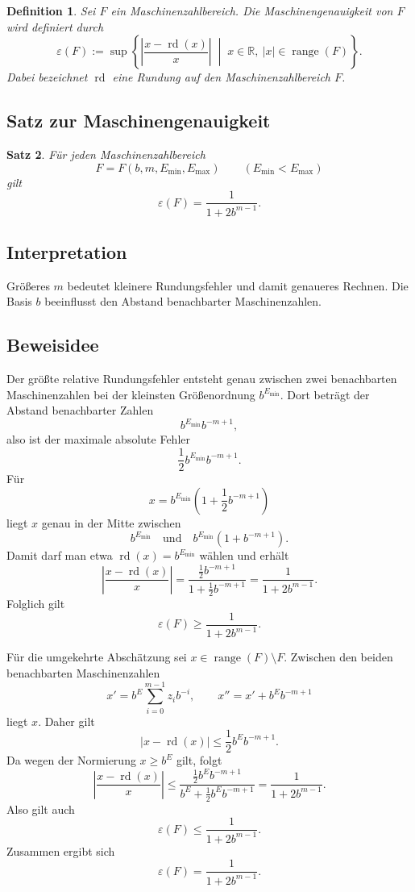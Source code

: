 \documentclass{article}
\newcommand{\R}{\mathbb{R}}
\newtheorem{thm}{Satz}
\newtheorem{defn}[thm]{Definition}
\begin{document}
\begin{defn}
Sei \(F\) ein Maschinenzahlbereich. Die Maschinengenauigkeit von \(F\) wird definiert durch
\[
\varepsilon(F)
:=
\sup\left\{
\left|\frac{x-\operatorname{rd}(x)}{x}\right|
\;\middle|\;
x\in\R,\ |x|\in\operatorname{range}(F)
\right\}.
\]
Dabei bezeichnet \(\operatorname{rd}\) eine Rundung auf den Maschinenzahlbereich \(F\).
\end{defn}

\subsection*{Satz zur Maschinengenauigkeit}

\begin{thm}
Für jeden Maschinenzahlbereich
\[
F=F(b,m,E_{\min},E_{\max})
\qquad (E_{\min}<E_{\max})
\]
gilt
\[
\varepsilon(F)=\frac{1}{1+2b^{m-1}}.
\]
\end{thm}

\subsection*{Interpretation}

Größeres \(m\) bedeutet kleinere Rundungsfehler und damit genaueres Rechnen. Die Basis \(b\) beeinflusst den Abstand benachbarter Maschinenzahlen.

\subsection*{Beweisidee}

Der größte relative Rundungsfehler entsteht genau zwischen zwei benachbarten Maschinenzahlen bei der kleinsten Größenordnung \(b^{E_{\min}}\). Dort beträgt der Abstand benachbarter Zahlen
\[
b^{E_{\min}}b^{-m+1},
\]
also ist der maximale absolute Fehler
\[
\frac12 b^{E_{\min}}b^{-m+1}.
\]
Für
\[
x=b^{E_{\min}}\left(1+\frac12 b^{-m+1}\right)
\]
liegt \(x\) genau in der Mitte zwischen
\[
b^{E_{\min}}
\quad\text{und}\quad
b^{E_{\min}}\left(1+b^{-m+1}\right).
\]
Damit darf man etwa \(\operatorname{rd}(x)=b^{E_{\min}}\) wählen und erhält
\[
\left|\frac{x-\operatorname{rd}(x)}{x}\right|
=
\frac{\frac12 b^{-m+1}}{1+\frac12 b^{-m+1}}
=
\frac{1}{1+2b^{m-1}}.
\]
Folglich gilt
\[
\varepsilon(F)\geq \frac{1}{1+2b^{m-1}}.
\]

Für die umgekehrte Abschätzung sei \(x\in\operatorname{range}(F)\setminus F\). Zwischen den beiden benachbarten Maschinenzahlen
\[
x'=b^E\sum_{i=0}^{m-1}z_i b^{-i},
\qquad
x''=x'+b^E b^{-m+1}
\]
liegt \(x\). Daher gilt
\[
|x-\operatorname{rd}(x)|
\leq
\frac12 b^E b^{-m+1}.
\]
Da wegen der Normierung \(x\geq b^E\) gilt, folgt
\[
\left|\frac{x-\operatorname{rd}(x)}{x}\right|
\leq
\frac{\frac12 b^E b^{-m+1}}
{b^E+\frac12 b^E b^{-m+1}}
=
\frac{1}{1+2b^{m-1}}.
\]
Also gilt auch
\[
\varepsilon(F)\leq \frac{1}{1+2b^{m-1}}.
\]
Zusammen ergibt sich
\[
\varepsilon(F)=\frac{1}{1+2b^{m-1}}.
\]
\end{document}
